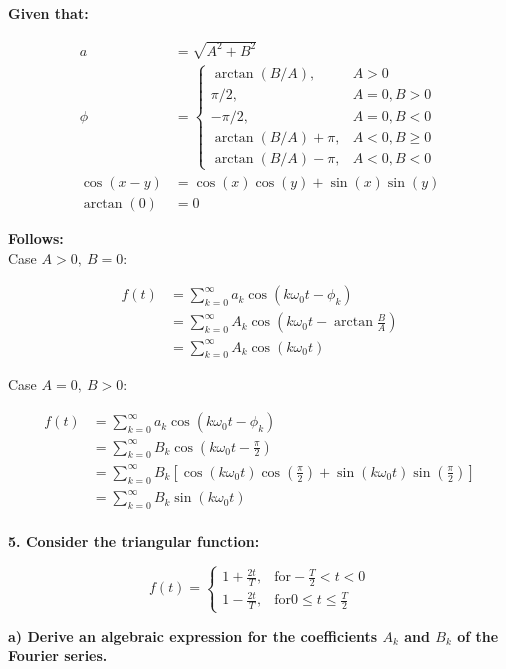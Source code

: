\textbf{Given that:}

\begin{align}
	a &= \sqrt{A^2 + B^2} \\
	\phi &= 
	\begin{cases}
		\arctan(B/A), & A > 0\\
		\pi/2, & A=0, B>0\\
		-\pi/2, & A=0, B<0\\
		\arctan(B/A)+\pi, & A<0, B \geq 0\\
		\arctan(B/A)-\pi, & A<0, B < 0
	\end{cases}
	\\
	\cos(x-y) &= \cos(x)\cos(y) + \sin(x)\sin(y)\\
	\arctan(0) &= 0
\end{align}

\textbf{Follows:}
\\

Case $A>0,\ B=0$:

\begin{align*}
	f(t) &= \sum_{k=0}^\infty a_k \cos(k \omega_0 t - \phi_k) \\
	&= \sum_{k=0}^\infty A_k \cos\left(k \omega_0 t - \arctan{\frac{B}{A}}\right) \\
	&= \sum_{k=0}^\infty A_k \cos(k \omega_0 t) 
\end{align*}

Case $A=0,\ B>0$:

\begin{align*}
	f(t) &= \sum_{k=0}^\infty a_k \cos(k \omega_0 t - \phi_k) \\
	&= \sum_{k=0}^\infty B_k \cos\left(k \omega_0 t - \frac{\pi}{2}\right) \\
	&= \sum_{k=0}^\infty B_k \left[\cos(k \omega_0 t) \cos\left(\frac{\pi}{2}\right) + \sin(k \omega_0 t) \sin\left(\frac{\pi}{2}\right) \right]\\
	&= \sum_{k=0}^\infty B_k \sin(k \omega_0 t) 
\end{align*}
\\

\textbf{5. Consider the triangular function:}

\[
	f(t) = 
	\begin{cases}
		1+\frac{2t}{T},& \text{for} - \frac{T}{2}<t<0\\
		1-\frac{2t}{T},& \text{for} 0\leq t \leq \frac{T}{2}
	\end{cases}
\]

\textbf{a) Derive an algebraic expression for the coefficients $A_k$ and $B_k$ of the Fourier series.}


